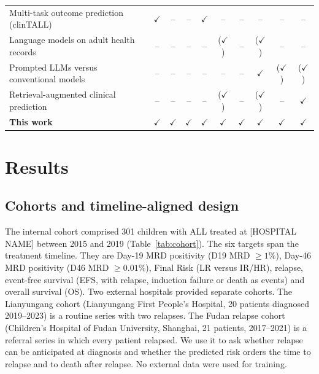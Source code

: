\documentclass[pdflatex,sn-nature]{sn-jnl}
\begin{document}
\begin{table}[t]
\begin{tabular}{@{}>{\raggedright\arraybackslash}p{6.0cm}*{9}{c}@{}}
Multi-task outcome prediction (clinTALL)~\cite{[CITE:Stoiber2026]} & $\checkmark$ & -- & -- & $\checkmark$ & -- & -- & -- & -- & -- \\
Language models on adult health records~\cite{[CITE:Jiang2023NYUTron],[CITE:Renc2024ETHOS],[CITE:Kiermeyer2026]} & -- & -- & -- & -- & ($\checkmark$) & -- & ($\checkmark$) & -- & -- \\
Prompted LLMs versus conventional models~\cite{[CITE:Zhu2026ClinicRealm],[CITE:ClinicalBench2026],[CITE:Brown2025JAMIA]} & -- & -- & -- & -- & -- & -- & $\checkmark$ & ($\checkmark$) & ($\checkmark$) \\
Retrieval-augmented clinical prediction~\cite{[CITE:ChenPSB2026],[CITE:Datta2026],[CITE:Xu2024RAMEHR],[CITE:Zhu2024EMERGE],[CITE:Chen2025JMIR]} & -- & -- & -- & -- & ($\checkmark$) & -- & ($\checkmark$) & -- & $\checkmark$ \\
\midrule
\textbf{This work} & $\checkmark$ & $\checkmark$ & $\checkmark$ & $\checkmark$ & $\checkmark$ & $\checkmark$ & $\checkmark$ & $\checkmark$ & $\checkmark$ \\
\bottomrule
\end{tabular}
\end{table}

\section{Results}\label{sec:results}

\subsection{Cohorts and timeline-aligned design}
\label{sec:cohort}

The internal cohort comprised 301 children with ALL treated at
[HOSPITAL NAME] between 2015 and 2019 (Table~\ref{tab:cohort}).
The six targets span the treatment timeline.
They are Day-19 MRD positivity (D19 MRD $\geq 1\%$), Day-46 MRD
positivity (D46 MRD $\geq 0.01\%$), Final Risk (LR versus IR/HR),
relapse, event-free survival (EFS, with relapse, induction failure or
death as events) and overall survival (OS).
Two external hospitals provided separate cohorts.
The Lianyungang cohort (Lianyungang First People's Hospital, 20
patients diagnosed 2019--2023) is a routine series with two relapses.
The Fudan relapse cohort (Children's Hospital of Fudan University,
Shanghai, 21 patients, 2017--2021) is a referral series in which every
patient relapsed.
We use it to ask whether relapse can be anticipated at diagnosis and
whether the predicted risk orders the time to relapse and to death
after relapse.
No external data were used for training.
\end{document}
